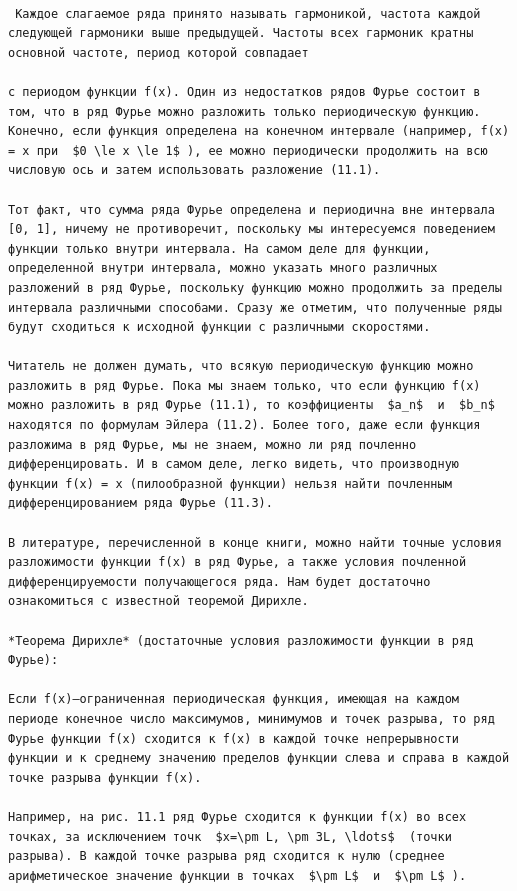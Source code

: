 \documentclass[
  ukrainian,
]{article}
\begin{document}
\begin{verbatim}

 Каждое слагаемое ряда принято называть гармоникой, частота каждой следующей гармоники выше предыдущей. Частоты всех гармоник кратны основной частоте, период которой совпадает

с периодом функции f(x). Один из недостатков рядов Фурье состоит в том, что в ряд Фурье можно разложить только периодическую функцию. Конечно, если функция определена на конечном интервале (например, f(x) = x при  $0 \le x \le 1$ ), ее можно периодически продолжить на всю числовую ось и затем использовать разложение (11.1).

Тот факт, что сумма ряда Фурье определена и периодична вне интервала [0, 1], ничему не противоречит, поскольку мы интересуемся поведением функции только внутри интервала. На самом деле для функции, определенной внутри интервала, можно указать много различных разложений в ряд Фурье, поскольку функцию можно продолжить за пределы интервала различными способами. Сразу же отметим, что полученные ряды будут сходиться к исходной функции с различными скоростями.

Читатель не должен думать, что всякую периодическую функцию можно разложить в ряд Фурье. Пока мы знаем только, что если функцию f(x) можно разложить в ряд Фурье (11.1), то коэффициенты  $a_n$  и  $b_n$  находятся по формулам Эйлера (11.2). Более того, даже если функция разложима в ряд Фурье, мы не знаем, можно ли ряд почленно дифференцировать. И в самом деле, легко видеть, что производную функции f(x) = x (пилообразной функции) нельзя найти почленным дифференцированием ряда Фурье (11.3).

В литературе, перечисленной в конце книги, можно найти точные условия разложимости функции f(x) в ряд Фурье, а также условия почленной дифференцируемости получающегося ряда. Нам будет достаточно ознакомиться с известной теоремой Дирихле.

*Теорема Дирихле* (достаточные условия разложимости функции в ряд Фурье):

Если f(x)—ограниченная периодическая функция, имеющая на каждом периоде конечное число максимумов, минимумов и точек разрыва, то ряд Фурье функции f(x) сходится к f(x) в каждой точке непрерывности функции и к среднему значению пределов функции слева и справа в каждой точке разрыва функции f(x).

Например, на рис. 11.1 ряд Фурье сходится к функции f(x) во всех точках, за исключением точк  $x=\pm L, \pm 3L, \ldots$  (точки разрыва). В каждой точке разрыва ряд сходится к нулю (среднее арифметическое значение функции в точках  $\pm L$  и  $\pm L$ ).


\end{verbatim}
\end{document}
